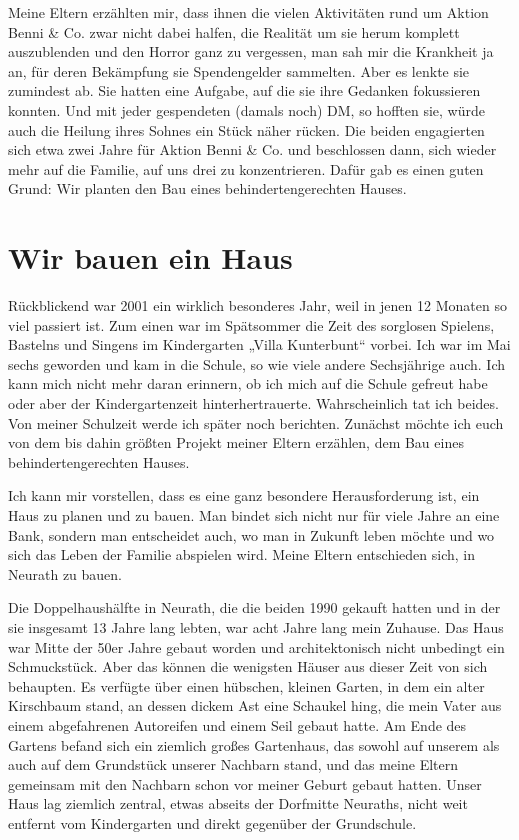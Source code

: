 \documentclass[fontsize=12pt,a4paper,headinclude,DIV=calc,automark]{scrbook}
\begin{document}
Meine Eltern erzählten mir, dass ihnen die vielen Aktivitäten rund um Aktion Benni \& Co. zwar nicht dabei halfen, die Realität um sie herum komplett auszublenden und den Horror ganz zu vergessen, man sah mir die Krankheit ja an, für deren Bekämpfung sie Spendengelder sammelten. Aber es lenkte sie zumindest ab. Sie hatten eine Aufgabe, auf die sie ihre Gedanken fokussieren konnten. Und mit jeder gespendeten (damals noch) DM, so hofften sie, würde auch die Heilung ihres Sohnes ein Stück näher rücken. Die beiden engagierten sich etwa zwei Jahre für Aktion Benni \& Co. und beschlossen dann, sich wieder mehr auf die Familie, auf uns drei zu konzentrieren. Dafür gab es einen guten Grund: Wir planten den Bau eines behindertengerechten Hauses.

\section{Wir bauen ein Haus}

Rückblickend war 2001 ein wirklich besonderes Jahr, weil in jenen 12 Monaten so viel passiert ist. Zum einen war im Spätsommer die Zeit des sorglosen Spielens, Bastelns und Singens im Kindergarten „Villa Kunterbunt“ vorbei. Ich war im Mai sechs geworden und kam in die Schule, so wie viele andere Sechsjährige auch. Ich kann mich nicht mehr daran erinnern, ob ich mich auf die Schule gefreut habe oder aber der Kindergartenzeit hinterhertrauerte. Wahrscheinlich tat ich beides. Von meiner Schulzeit werde ich später noch berichten. Zunächst möchte ich euch von dem bis dahin größten Projekt meiner Eltern erzählen, dem Bau eines behindertengerechten Hauses.

Ich kann mir vorstellen, dass es eine ganz besondere Herausforderung ist, ein Haus zu planen und zu bauen. Man bindet sich nicht nur für viele Jahre an eine Bank, sondern man entscheidet auch, wo man in Zukunft leben möchte und wo sich das Leben der Familie abspielen wird. Meine Eltern entschieden sich, in Neurath zu bauen.

Die Doppelhaushälfte in Neurath, die die beiden 1990 gekauft hatten und in der sie insgesamt 13 Jahre lang lebten, war acht Jahre lang mein Zuhause. Das Haus war Mitte der 50er Jahre gebaut worden und architektonisch nicht unbedingt ein Schmuckstück. Aber das können die wenigsten Häuser aus dieser Zeit von sich behaupten. Es verfügte über einen hübschen, kleinen Garten, in dem ein alter Kirschbaum stand, an dessen dickem Ast eine Schaukel hing, die mein Vater aus einem abgefahrenen Autoreifen und einem Seil gebaut hatte. Am Ende des Gartens befand sich ein ziemlich großes Gartenhaus, das sowohl auf unserem als auch auf dem Grundstück unserer Nachbarn stand, und das meine Eltern gemeinsam mit den Nachbarn schon vor meiner Geburt gebaut hatten. Unser Haus lag ziemlich zentral, etwas abseits der Dorfmitte Neuraths, nicht weit entfernt vom Kindergarten und direkt gegenüber der Grundschule.
\end{document}
